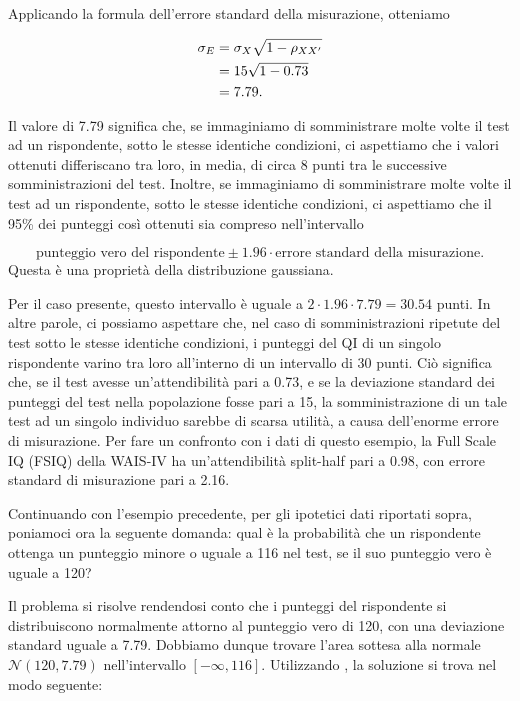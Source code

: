 \documentclass[
  11pt,
]{krantz}
\theoremstyle{definition}
\theoremstyle{definition}
\theoremstyle{definition}
\theoremstyle{definition}
\theoremstyle{remark}
\begin{document}
Applicando la formula dell'errore standard della misurazione, otteniamo

\begin{equation}
\begin{aligned}
\sigma_E &= \sigma_X \sqrt{1 -\rho_{XX^\prime}} \notag\\
&= 15 \sqrt{1 - 0.73} \notag\\
&= 7.79.\notag
\end{aligned}
\end{equation}

Il valore di 7.79 significa che, se immaginiamo di somministrare molte volte il test ad un rispondente, sotto le stesse identiche condizioni, ci aspettiamo che i valori ottenuti differiscano tra loro, in media, di circa 8 punti tra le successive somministrazioni del test. Inoltre, se immaginiamo di somministrare molte volte il test ad un rispondente, sotto le stesse identiche condizioni, ci aspettiamo che il 95\% dei punteggi così ottenuti sia compreso nell'intervallo

\[
\text{punteggio vero del rispondente} \pm 1.96 \cdot \text{errore standard della misurazione}. 
\] Questa è una proprietà della distribuzione gaussiana.

Per il caso presente, questo intervallo è uguale a \(2 \cdot 1.96 \cdot 7.79 = 30.54\) punti. In altre parole, ci possiamo aspettare che, nel caso di somministrazioni ripetute del test sotto le stesse identiche condizioni, i punteggi del QI di un singolo rispondente varino tra loro all'interno di un intervallo di 30 punti. Ciò significa che, se il test avesse un'attendibilità pari a 0.73, e se la deviazione standard dei punteggi del test nella popolazione fosse pari a 15, la somministrazione di un tale test ad un singolo individuo sarebbe di scarsa utilità, a causa dell'enorme errore di misurazione. Per fare un confronto con i dati di questo esempio, la Full Scale IQ (FSIQ) della WAIS-IV \citep{wechsler2008wechsler} ha un'attendibilità split-half pari a 0.98, con errore standard di misurazione pari a 2.16.

Continuando con l'esempio precedente, per gli ipotetici dati riportati sopra, poniamoci ora la seguente domanda: qual è la probabilità che un rispondente ottenga un punteggio minore o uguale a 116 nel test, se il suo punteggio vero è uguale a 120?

Il problema si risolve rendendosi conto che i punteggi del rispondente si distribuiscono normalmente attorno al punteggio vero di 120, con una deviazione standard uguale a 7.79. Dobbiamo dunque trovare l'area sottesa alla normale \(\mathcal{N}(120, 7.79)\) nell'intervallo \([-\infty, 116]\). Utilizzando , la soluzione si trova nel modo seguente:
\end{document}
